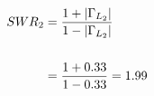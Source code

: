 \documentclass[12pt,a4paper,openright]{report}
\begin{document}
\begin{enumerate}
\begin{enumerate}
			\begin{align*}
			SWR_{2}&=\frac{1+\vert\Gamma_{L_2}\vert}{1-\vert\Gamma_{L_2}\vert}\\\medskip\\&\notag=\frac{1+0.33}{1-0.33}=1.99
			\end{align*}
		\end{enumerate}
	\end{enumerate}

    
\end{document}
